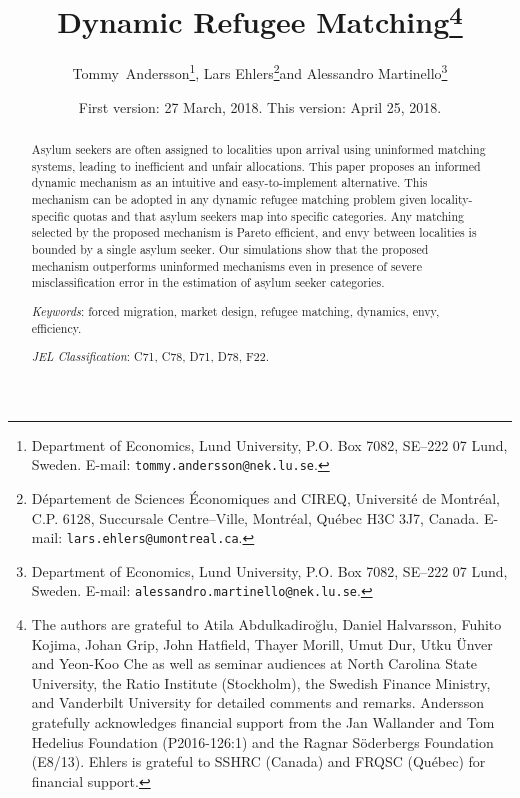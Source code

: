 \documentclass[12pt,fleqn]{article}
\begin{document}
\title{\textbf{Dynamic Refugee Matching}\footnote{The authors are grateful to Atila Abdulkadiro\u{g}lu, Daniel Halvarsson, Fuhito Kojima, Johan Grip, John Hatfield, Thayer Morill, Umut Dur, Utku \"{U}nver and Yeon-Koo Che as well as seminar audiences at North Carolina State University, the Ratio Institute (Stockholm), the Swedish Finance Ministry, and Vanderbilt University for detailed comments and remarks. Andersson gratefully acknowledges financial support from the Jan Wallander and Tom Hedelius Foundation (P2016-126:1) and the Ragnar S\"oderbergs Foundation (E8/13). Ehlers is grateful to SSHRC (Canada) and FRQSC (Qu\'{e}bec) for financial support.}}

\author{Tommy~Andersson\footnote{Department of Economics, Lund University, P.O. Box 7082, SE--222 07 Lund, Sweden. E-mail: \texttt{tommy.andersson@nek.lu.se}.}, Lars Ehlers\footnote{D\'epartement de Sciences \'Economiques and CIREQ, Universit\'e de Montr\'eal, C.P. 6128, Succursale Centre--Ville, Montr\'eal, Qu\'ebec H3C
3J7, Canada. E-mail: \texttt{lars.ehlers@umontreal.ca}.}\space\space and Alessandro Martinello\footnote{Department of Economics, Lund University, P.O. Box 7082, SE--222 07 Lund, Sweden. E-mail: \texttt{alessandro.martinello@nek.lu.se}.}}

\date{\small{First version: 27 March, 2018. This version: April 25, 2018.}}

\maketitle
\vspace*{-4mm}
\begin{abstract}
\noindent Asylum seekers are often assigned to localities upon arrival using uninformed matching systems, leading to inefficient and unfair allocations. This paper proposes an informed dynamic mechanism as an intuitive and easy-to-implement alternative. This mechanism can be adopted in any dynamic refugee matching problem given locality-specific quotas and that asylum seekers map into specific categories. Any matching selected by the proposed mechanism is Pareto efficient, and envy between localities is bounded by a single asylum seeker. Our simulations show that the proposed mechanism outperforms uninformed mechanisms even in presence of severe misclassification error in the estimation of asylum seeker categories.

\medskip

\noindent\emph{Keywords}: forced migration, market design, refugee matching, dynamics, envy, efficiency.

\medskip

\noindent\emph{JEL Classification}: C71, C78, D71, D78, F22.

\end{abstract}
\end{document}
